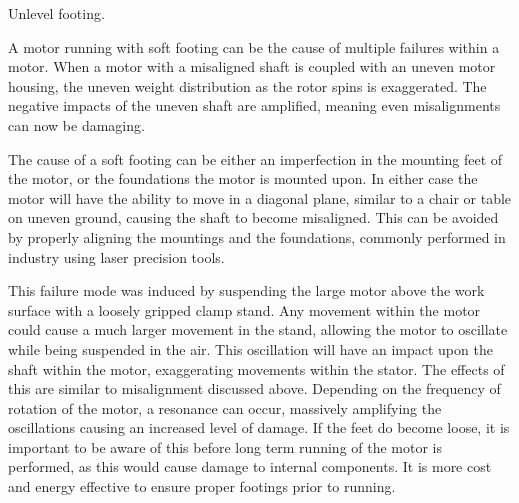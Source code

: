 

Unlevel footing.

A motor running with soft footing can be the cause of multiple failures within a motor. When a motor with a misaligned shaft is coupled with an uneven motor housing, the uneven weight distribution as the rotor spins is exaggerated. The negative impacts of the uneven shaft are amplified, meaning even misalignments can now be damaging. 

The cause of a soft footing can be either an imperfection in the mounting feet of the motor, or the foundations the motor is mounted upon. In either case the motor will have the ability to move in a diagonal plane, similar to a chair or table on uneven ground, causing the shaft to become misaligned. This can be avoided by properly aligning the mountings and the foundations, commonly performed in industry using laser precision tools. 

This failure mode was induced by suspending the large motor above the work surface with a loosely gripped clamp stand. Any movement within the motor could cause a much larger movement in the stand, allowing the motor to oscillate while being suspended in the air. This oscillation will have an impact upon the shaft within the motor, exaggerating movements within the stator. The effects of this are similar to misalignment discussed above. Depending on the frequency of rotation of the motor, a resonance can occur, massively amplifying the oscillations causing an increased level of damage. If the feet do become loose, it is important to be aware of this before long term running of the motor is performed, as this would cause damage to internal components. It is more cost and energy effective to ensure proper footings prior to running.

